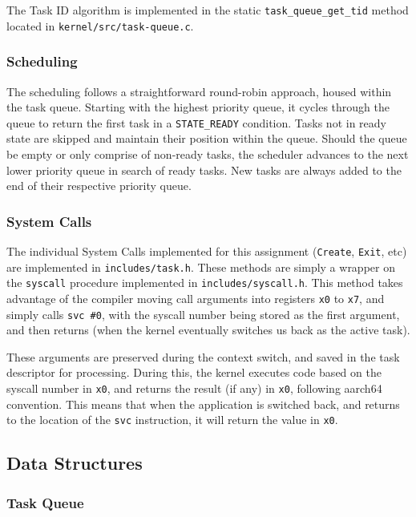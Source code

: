 \documentclass[12pt]{article}
\begin{document}
    The Task ID algorithm is implemented in the static \verb`task_queue_get_tid` method located in \verb`kernel/src/task-queue.c`.

    \subsubsection{Scheduling}
    \label{sec:scheduling}

    The scheduling follows a straightforward round-robin approach, housed within the task queue.
    Starting with the highest priority queue, it cycles through the queue to return the first task in a \verb`STATE_READY` condition.
    Tasks not in ready state are skipped and maintain their position within the queue.
    Should the queue be empty or only comprise of non-ready tasks, the scheduler advances to the next lower priority queue in search of ready tasks.
    New tasks are always added to the end of their respective priority queue.

    \subsubsection{System Calls}
    \label{sec:sys-calls}

    The individual System Calls implemented for this assignment (\verb`Create`, \verb`Exit`, etc) are implemented in \verb`includes/task.h`. These methods are simply a wrapper on the \verb`syscall` procedure implemented in \verb`includes/syscall.h`. This method takes advantage of the compiler moving call arguments into registers \verb`x0` to \verb`x7`, and simply calls \verb`svc #0`, with the syscall number being stored as the first argument, and then returns (when the kernel eventually switches us back as the active task).

    These arguments are preserved during the context switch, and saved in the task descriptor for processing. During this, the kernel executes code based on the syscall number in \verb`x0`, and returns the result (if any) in \verb`x0`, following aarch64 convention. This means that when the application is switched back, and returns to the location of the \verb`svc` instruction, it will return the value in \verb`x0`.

    \subsection{Data Structures}

    \subsubsection{Task Queue}
    \label{sec:task-queue}
\end{document}
